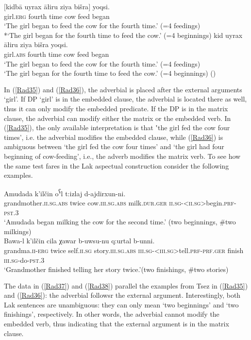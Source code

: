 \documentclass[output=paper]{langscibook}
\begin{document}
\ea\label{Rad35}
\gll $[$kidbā uyrax āłiru ziya bišra$]$ yoqsi.\\
 girl.\textsc{erg} fourth time cow feed began\\
\glt ‘The girl began to feed the cow for the fourth time.’ (=4 feedings)\\
*‘The girl began for the fourth time to feed the cow.’ (=4 beginnings)
\ex\label{Rad36}
\gll kid uyrax āłiru ziya bišra yoqsi.\\
girl.\textsc{abs} fourth time cow feed began\\
\glt ‘The girl began to feed the cow for the fourth time.’ (=4 feedings)\\
‘The girl began for the fourth time to feed the cow.’ (=4 beginnings) (\citealt[255]{PolinskyPotsdam2002})
\z 

In (\ref{Rad35}) and (\ref{Rad36}), the adverbial is placed after the external arguments ‘girl’. If DP ‘girl’ is in the embedded clause, the adverbial is located there as well, thus it can only modify the embedded predicate. If the DP is in the matrix clause, the adverbial can modify either the matrix or the embedded verb. In (\ref{Rad35}), the only available interpretation is that ‛the girl fed the cow four times’, i.e. the adverbial modifies the embedded clause, while (\ref{Rad36}) is ambiguous between ‘the girl fed the cow four times’ and ‘the girl had four beginning of cow-feeding’, i.e., the adverb modifies the matrix verb. To see how the same test fares in the Lak aspectual construction consider the following examples.

\ea\label{Rad37}
\gll Amudada k’ilčin o\textsuperscript{ʕ}l t:izlaj d-ajdirxun-ni.\\
grandmother.\textsc{ii.sg.abs} twice cow.\textsc{iii.sg.abs} milk.\textsc{dur.ger} \textsc{ii.sg-<ii.sg>}begin.\textsc{prf-pst.3}\\
\glt ‘Amudada began milking the cow for the second time.’ (two beginnings, \#two milkings)\\
\ex\label{Rad38}
\gll Bawa-l k’ilčin cila χawar b-uwsu-nu q:urtal b-unni.\\
grandma.\textsc{ii-erg} twice self.\textsc{ii.sg} story.\textsc{iii.sg.abs} \textsc{iii.sg-<iii.sg>}tell.\textsc{prf-prf.ger} finish 	\textsc{iii.sg}-do-\textsc{pst.3}\\
\glt ‘Grandmother finished telling her story twice.’(two finishings, \#two stories)\\
\z 

The data in (\ref{Rad37}) and (\ref{Rad38}) parallel the examples from Tsez in (\ref{Rad35}) and (\ref{Rad36}): the adverbial followsr the external argument.  Interestingly, both Lak sentences are unambiguous: they can only mean ‘two beginnings’ and ‘two finishings’, respectively. In other words, the adverbial cannot modify the embedded verb, thus indicating that the external argument is in the matrix clause. 
\end{document}
